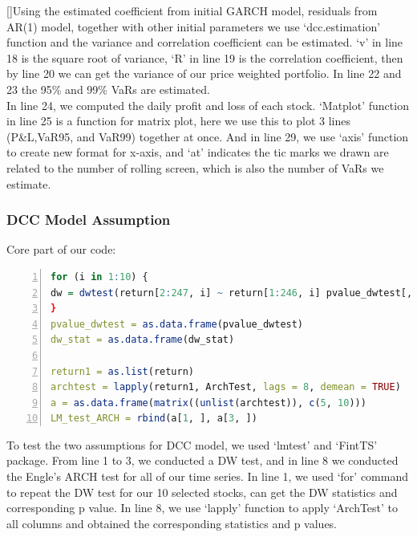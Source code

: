     [\baselineskip]\indent Using the estimated coefficient from initial GARCH model, residuals from AR(1) model, together with other initial parameters we use `dcc.estimation' function and the variance and correlation coefficient can be estimated. `v' in line 18 is the square root of variance, `R' in line 19 is the correlation coefficient, then by line 20 we can get the variance of our price weighted portfolio. In line 22 and 23 the 95\% and 99\% VaRs are estimated.\\
    [\baselineskip]\indent In line 24, we computed the daily profit and loss of each stock. `Matplot' function in line 25 is a function for matrix plot, here we use this to plot 3 lines (P\&L,VaR95, and VaR99) together at once. And in line 29, we use `axis' function to create new format for x-axis, and `at' indicates the tic marks we drawn are related to the number of rolling screen, which is also the number of VaRs we estimate.\\

    \subsubsection{DCC Model Assumption}
    \noindent Core part of our code:\\
    \begin{lstlisting}[language=R,numbers=left, numberstyle=\normalsize]
for (i in 1:10) {
dw = dwtest(return[2:247, i] ~ return[1:246, i] pvalue_dwtest[, i] = dw$p.valuedw_stat[, i] =     dw$statistic
}
pvalue_dwtest = as.data.frame(pvalue_dwtest)
dw_stat = as.data.frame(dw_stat)

return1 = as.list(return)
archtest = lapply(return1, ArchTest, lags = 8, demean = TRUE)
a = as.data.frame(matrix((unlist(archtest)), c(5, 10)))
LM_test_ARCH = rbind(a[1, ], a[3, ])
    \end{lstlisting}

   \noindent To test the two assumptions for DCC model, we used `lmtest' and `FintTS' package. From line 1 to 3, we conducted a DW test, and in line 8 we conducted the Engle's ARCH test for all of our time series. In line 1, we used `for' command to repeat the DW test for our 10 selected stocks, can get the DW statistics and corresponding p value. In line 8, we use `lapply' function to apply `ArchTest' to all columns and obtained the corresponding statistics and p values.\\

    \newpage
    \pagestyle{fancy}
